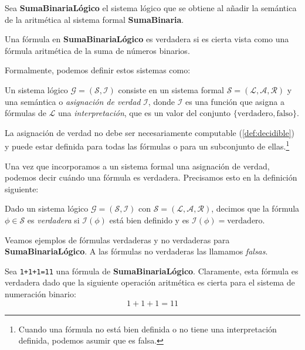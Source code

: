 \begin{sistemalogico}\label{sl:suma-binaria-logico}
Sea \textbf{SumaBinariaLógico} el sistema lógico que se obtiene al añadir la semántica de la aritmética al sistema formal \textbf{SumaBinaria}.

Una fórmula en \textbf{SumaBinariaLógico} es verdadera si es cierta vista como una fórmula aritmética de la suma de números binarios.
\end{sistemalogico}

Formalmente, podemos definir estos sistemas como:

\begin{definicion}\label{def:sistema-logico}
Un sistema lógico $\mathcal{G} = (\mathcal{S}, \mathcal{I})$ consiste en un sistema formal $\mathcal{S}=(\mathcal{L}, \mathcal{A}, \mathcal{R})$ y una semántica o \emph{asignación de verdad} $\mathcal{I}$, donde $\mathcal{I}$ es una función que asigna a fórmulas de $\mathcal{L}$ una \emph{interpretación}, que es un valor del conjunto $\{\text{verdadero}, \text{falso}\}$.

La asignación de verdad no debe ser necesariamente computable (\cref{def:decidible}) y puede estar definida para todas las fórmulas o para un subconjunto de ellas.\footnote{Cuando una fórmula no está bien definida o no tiene una interpretación definida, podemos asumir que es falsa.}
\end{definicion}

Una vez que incorporamos a un sistema formal una asignación de verdad, podemos decir cuándo una fórmula es verdadera. Precisamos esto en la definición siguiente:

\begin{definicion}
Dado un sistema lógico $\mathcal{G}=(\mathcal{S}, \mathcal{I})$ con $\mathcal{S}=(\mathcal{L}, \mathcal{A}, \mathcal{R})$, decimos que la fórmula $\phi \in \mathcal{S}$ es \emph{verdadera} si $\mathcal{I}(\phi)$ está bien definido y es $\mathcal{I}(\phi)=\text{verdadero}$.
\end{definicion}

Veamos ejemplos de fórmulas verdaderas y no verdaderas para \textbf{SumaBinariaLógico}. A las fórmulas no verdaderas las llamamos \emph{falsas}.

\begin{ejemplo}\label{ej:suma-binaria-logico}
Sea \texttt{1+1+1=11} una fórmula de \textbf{SumaBinariaLógico}. Claramente, esta fórmula es verdadera dado que la siguiente operación aritmética es cierta para el sistema de numeración binario:
$$1+1+1=11$$
\end{ejemplo}

